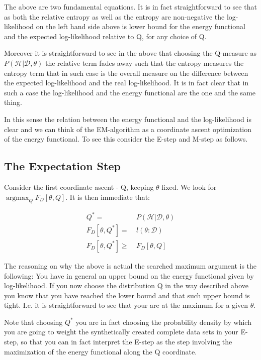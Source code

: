 \documentclass[11pt]{article}
\begin{document}
\begin{article}
The above are two fundamental equations. It is in fact
straightforward to see that as both the relative entropy as well as
the entropy are non-negative the log-likelihood on the left hand
side above is lower bound for the energy functional and the expected
log-likelihood relative to Q, for any choice of Q.

Moreover it is straightforward to see in the above that choosing the
Q-measure as \(P (\mathscr{H}|\mathscr{D}, \theta)\) the relative term
fades away such that the entropy measures the entropy term that in
such case is the overall measure on the difference between the
expected log-likelihood and the real log-likelihood. It is in fact
clear that in such a case the log-likelihood and the energy
functional are the one and the same thing.

In this sense the relation between the energy functional and the
log-likelihood is clear and we can think of the EM-algorithm as a
coordinate ascent optimization of the energy functional. To see this
consider the E-step and M-step as follows.

\subsection{The Expectation Step}
\label{sec:org8dfea9c}

Consider the first coordinate ascent - Q, keeping \(\theta\)
fixed. We look for \(\operatorname*{argmax}_{Q} F_D[\theta, Q]\). It
is then immediate that:

\begin{align} \label{eq:q_optimum}
Q^* =& \ P (\mathscr{H}|\mathscr{D}, \theta) \\
F_D[\theta, Q^*] =& \ l (\theta: \mathscr{D}) \\
F_D[\theta, Q^*] \geq& \ F_D[\theta, Q]
\end{align}

The reasoning on why the above is actual the searched maximum
argument is the following: You have in general an upper bound on the
energy functional given by log-likelihood. If you now choose the
distribution Q in the way described above you know that you have
reached the lower bound and that such upper bound is tight. I.e. it
is straightforward to see that your are at the maximum for a given
\(\theta\).

Note that choosing \(Q^*\) you are in fact choosing the probability
density by which you are going to weight the synthetically created
complete data sets in your E-step, so that you can in fact
interpret the E-step as the step involving the maximization of the
energy functional along the Q coordinate.


\end{article}
\end{document}
